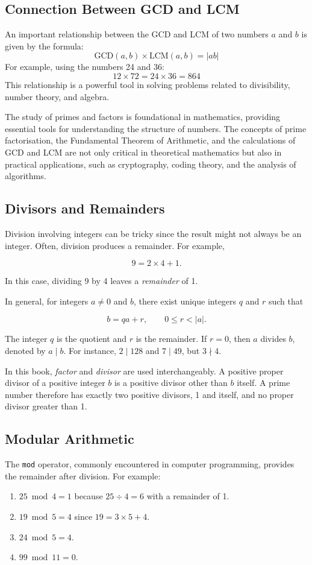 \subsection*{Connection Between GCD and LCM}

An important relationship between the GCD and LCM of two numbers \(a\) and \(b\) is given by the formula:
\[
\text{GCD}(a, b) \times \text{LCM}(a, b) = |a b|
\]
For example, using the numbers 24 and 36:
\[
12 \times 72 = 24 \times 36 = 864
\]
This relationship is a powerful tool in solving problems related to divisibility, number theory, and algebra.

The study of primes and factors is foundational in mathematics, providing essential tools for understanding the structure of numbers. The concepts of prime factorisation, the Fundamental Theorem of Arithmetic, and the calculations of GCD and LCM are not only critical in theoretical mathematics but also in practical applications, such as cryptography, coding theory, and the analysis of algorithms.

\subsection*{Divisors and Remainders}
\label{sec:2.3Mod}
Division involving integers can be tricky since the result might not always be an integer. Often, division produces a remainder. For example,

\[
9 = 2 \times 4 + 1.
\]

In this case, dividing 9 by 4 leaves a \textit{remainder} of 1.

In general, for integers \(a\neq0\) and \(b\), there exist unique integers $q$ and $r$ such that

\[
b = q a + r, \qquad 0\leq r<|a|.
\]

The integer $q$ is the quotient and \(r\) is the remainder. If \(r=0\), then \(a\) divides \(b\), denoted by \(a \mid b\). For instance, \(2 \mid 128\) and \(7 \mid 49\), but \(3 \nmid 4\).

In this book, \emph{factor} and \emph{divisor} are used interchangeably. A positive proper divisor of a positive integer $b$ is a positive divisor other than $b$ itself. A prime number therefore has exactly two positive divisors, 1 and itself, and no proper divisor greater than 1.

\subsection*{Modular Arithmetic}
The \texttt{mod} operator, commonly encountered in computer programming, provides the remainder after division. For example:
\begin{enumerate}
    \item \(25 \bmod 4 = 1\) because \(25 \div 4 = 6\) with a remainder of 1.
    \item \(19 \bmod 5 = 4\) since \(19 = 3 \times 5 + 4\).
    \item \(24 \bmod 5 = 4\).
    \item \(99 \bmod 11 = 0\).
\end{enumerate}

